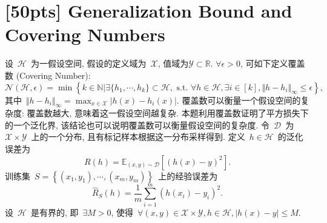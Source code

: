 \documentclass[a4paper,UTF8]{article}
\numberwithin{equation}{section}
\begin{document}
	\newpage
	
	\section{[50pts] Generalization Bound and Covering Numbers} 
	
	\noindent 设~$\mathcal{H}$~为一假设空间, 假设的定义域为~$\mathcal{X}$, 值域为$\mathcal{Y} \subset \mathbb{R}$. $\forall \epsilon > 0$, 可如下定义覆盖数 (Covering Number): 
	\begin{equation}
		\mathcal{N} ( \mathcal{H} , \epsilon ) 
		= \min \left\{ k \in \mathbb{N} | \exists \{ h_1 , \cdots , h_k \} \subset \mathcal{H} , \text{ s.t. } \forall h \in \mathcal{H} , \exists i \in [k] , \Vert h - h_i \Vert_\infty \leqslant \epsilon \right\} , 
	\end{equation}
	其中~$ \Vert h - h_i \Vert_\infty = \max_{x \in \mathcal{X}} | h(x) - h_i(x) | $. 覆盖数可以衡量一个假设空间的复杂度: 覆盖数越大, 意味着这一假设空间越复杂. 本题利用覆盖数证明了平方损失下的一个泛化界, 该结论也可以说明覆盖数可以衡量假设空间的复杂度. 令~$\mathcal{D}$~为~$\mathcal{X} \times \mathcal{Y}$~上的一个分布, 且有标记样本根据这一分布采样得到. 定义~$h \in \mathcal{H}$~的泛化误差为
	\begin{equation}
		R(h) = \mathbb{E}_{(x,y) \sim \mathcal{D}} \left[ (h(x)-y)^2 \right] . 
	\end{equation}
	训练集~$S = \left\{ (x_1,y_1) , \cdots , (x_m,y_m) \right\}$~上的经验误差为
	\begin{equation}
		\hat{R}_S(h) = \frac{1}{m} \sum_{i=1}^m (h(x_i)-y_i)^2 . 
	\end{equation}
	设~$\mathcal{H}$~是有界的, 即~$\exists M>0$, 使得~$ \forall (x,y) \in \mathcal{X} \times \mathcal{Y} , h \in \mathcal{H} , | h(x) - y | \leqslant M $. 
\end{document}
